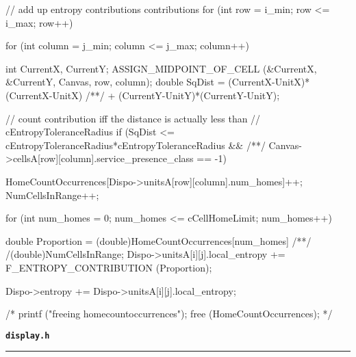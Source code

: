 \begin{C}
{{{{				// add up entropy contributions contributions
				for (int row = i_min; row <= i_max; row++){
					for (int column = j_min; column <= j_max; column++){
						
						int CurrentX, CurrentY;
						ASSIGN_MIDPOINT_OF_CELL (&CurrentX, &CurrentY, Canvas, row, column);
						double SqDist = (CurrentX-UnitX)*(CurrentX-UnitX)
						/**/ + (CurrentY-UnitY)*(CurrentY-UnitY);
						
						// count contribution iff the distance is actually less than
						// cEntropyToleranceRadius
						if (SqDist <= cEntropyToleranceRadius*cEntropyToleranceRadius &&
						/**/ Canvas->cellsA[row][column].service_presence_class == -1){
							
							HomeCountOccurrences[Dispo->unitsA[row][column].num_homes]++;
							NumCellsInRange++;
						}
					}
				}
				
				for (int num_homes = 0; num_homes <= cCellHomeLimit; num_homes++){
					
					double Proportion = (double)HomeCountOccurrences[num_homes]
					/**/ /(double)NumCellsInRange;
					Dispo->unitsA[i][j].local_entropy += F_ENTROPY_CONTRIBUTION (Proportion);
				}
				
				Dispo->entropy += Dispo->unitsA[i][j].local_entropy;
			}
		}
	}
	/* printf ("freeing homecountoccurrences\n");
	free (HomeCountOccurrences); */
}
\end{C}
\vspace*{5mm}
{\Large \texttt{\textbf{display.h}}}
\vspace*{1mm}
\hrule
